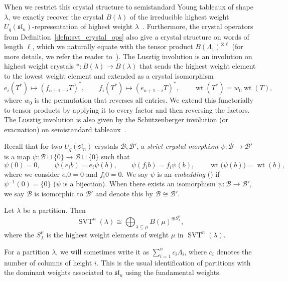 \documentclass[ALCO,ThmDefs,Unicode,epreuves]{cedram}
\newcommand{\iso}{\cong}
\newcommand{\fsl}{\mathfrak{sl}}
\DeclareMathOperator{\wt}{wt} %
\DeclareMathOperator{\svt}{SVT} %
\newcommand{\mcB}{\mathcal{B}}
\newcommand{\defn}[1]{{\color{darkred}\emph{#1}}} %
\begin{document}
When we restrict this crystal structure to semistandard Young tableaux of shape $\lambda$, we exactly recover the crystal $B(\lambda)$ of the irreducible highest weight $U_q(\fsl_n)$-representation of highest weight $\lambda$~\cite{K90,K91}. Furthermore, the crystal operators from Definition~\ref{defn:svt_crystal_ops} also give a crystal structure on words of length $\ell$, which we naturally equate with the tensor product $B(\Lambda_1)^{\otimes \ell}$ (for more details, we refer the reader to~\cite{BS17}).
The Lusztig involution is an involution on highest weight crystals $\ast \colon B(\lambda) \to B(\lambda)$ that sends the highest weight element to the lowest weight element and extended as a crystal isomorphism
\[
e_i(T^*) \mapsto (f_{n+1-i}T)^*,
\qquad
f_i(T^*) \mapsto (e_{n+1-i}T)^*,
\qquad
\wt(T^*) = w_0 \wt(T),
\]
where $w_0$ is the permutation that reverses all entries. We extend this functorially to tensor products by applying it to every factor and then reversing the factors. The Lusztig involution is also given by the Sch{\"u}tzenberger involution (or evacuation) on semistandard tableaux~\cite{Lenart07}.

Recall that for two $U_q(\fsl_n)$-crystals $\mcB, \mcB'$, a \defn{strict crystal morphism} $\psi \colon \mcB \to \mcB'$ is a map $\psi \colon \mcB \sqcup \{0\} \to \mcB \sqcup \{0\}$ such that
\[
\psi(0) = 0,
\qquad
\psi(e_i b) = e_i \psi(b),
\qquad
\psi(f_i b) = f_i \psi(b),
\qquad
\wt\bigl( \psi(b) \bigr) = \wt(b),
\]
where we consider $e_i 0 = 0$ and $f_i 0 = 0$.
We say $\psi$ is an \defn{embedding} (\resp \defn{isomorphism}) if $\psi^{-1}(0) = \{0\}$ (\resp $\psi$ is a bijection).
When there exists an isomorphism $\psi \colon \mcB \to \mcB'$, we say $\mcB$ is isomorphic to $\mcB'$ and denote this by $\mcB \iso \mcB'$.

\begin{theo}
\label{thm:svt_crystal}
Let $\lambda$ be a partition. Then
\[
\svt^n(\lambda) \iso \bigoplus_{\lambda \subseteq \mu} B(\mu)^{\oplus S_{\lambda}^{\mu}},
\]
where the $S_{\lambda}^{\mu}$ is the highest weight elements of weight $\mu$ in $\svt^n(\lambda)$.
\end{theo}

For a partition $\lambda$, we will sometimes write it as $\sum_{i=1}^n c_i \Lambda_i$, where $c_i$ denotes the number of columns of height $i$.
This is the usual identification of partitions with the dominant weights associated to $\fsl_n$ using the fundamental weights.
\end{document}
